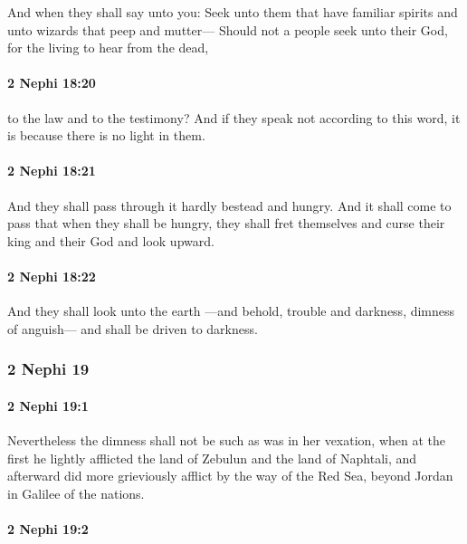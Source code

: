 			And when they shall say unto you:
			Seek unto them that have familiar spirits
			and unto wizards that peep and mutter---
			Should not a people seek unto their God,
			for the living to hear from the dead,

		\paragraph{2 Nephi 18:20} %
			\label{2NEPHI-18-20}

			to the law and to the testimony?
			And if they speak not according to this word,
			it is because there is no light in them.

		\paragraph{2 Nephi 18:21} %
			\label{2NEPHI-18-21}

			And they shall pass through it hardly bestead and hungry.
			And it shall come to pass that when they shall be hungry,
			they shall fret themselves and curse their king and their God and look upward.

		\paragraph{2 Nephi 18:22} %
			\label{2NEPHI-18-22}

			And they shall look unto the earth
			---and behold, trouble and darkness, dimness of anguish---
			and shall be driven to darkness.

	\subsubsection{2 Nephi 19} %
		\label{2NEPHI-19}
		
		\paragraph{2 Nephi 19:1} %
			\label{2NEPHI-19-1}

			Nevertheless the dimness shall not be such as was in her vexation,
			when at the first he lightly afflicted the land of Zebulun and the land of Naphtali,
			and afterward did more grieviously afflict by the way of the Red Sea,
			beyond Jordan in Galilee of the nations.

		\paragraph{2 Nephi 19:2} %
			\label{2NEPHI-19-2}

